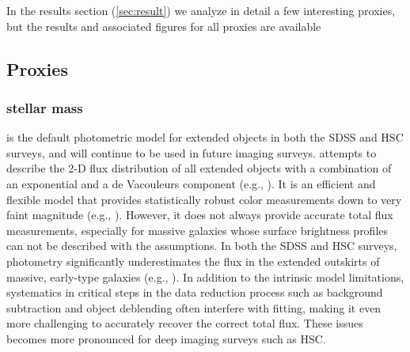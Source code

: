 \documentclass[fleqn,usenatbib,useAMS,english]{mnras}
\begin{document}
    In the results section (\ref{sec:result}) we analyze in detail a few interesting proxies,
    but the results and associated figures for all proxies are available

\subsection{Proxies}

\subsubsection{\cmodel{} stellar mass}
    \label{sec:mcmodel}

    \cmodel{} is the default photometric model for extended objects in both the SDSS and HSC surveys,
    and will continue to be used in future imaging surveys.
    \cmodel{} attempts to describe the 2-D flux distribution of all extended objects with a
    combination of an exponential and a de Vacouleurs component (e.g., \citealt{HSC-PIPE}).
    It is an efficient and flexible model that provides statistically robust color measurements
    down to very faint magnitude (e.g., \citealt{SynPipe}).
    However, it does not always provide accurate total flux measurements, especially for
    massive galaxies whose surface brightness profiles can not be described with the \cmodel{}
    assumptions.
    In both the SDSS and HSC surveys, \cmodel{} photometry significantly underestimates the
    flux in the extended outskirts of massive, early-type galaxies (e.g., \citealt{Bernardi2013,
    Huang2018b}).
    In addition to the intrinsic model limitations, systematics in critical steps in
    the data reduction process such as background subtraction and object deblending often
    interfere with \cmodel{} fitting, making it even more challenging to accurately recover the
    correct total flux.
    These issues becomes more pronounced for deep imaging surveys such as HSC.
\end{document}
